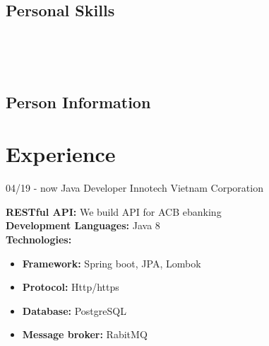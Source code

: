 \documentclass[]{friggeri-cv}
\begin{document}
\begin{aside}
  \section{Personal Skills}
~
    ~
\end{aside}
~

\begin{entrylist}
	\hspace{0.5cm} 
\end{entrylist}
\begin{center}
\section{Person Information}
\end{center}

\begin{entrylist}
		\hspace{2cm} 	 
		\hspace{2cm} 	
		\hspace{2cm} 	
		\hspace{2cm} 	
		\hspace{2cm} 	
\end{entrylist}

\section{Experience}

\begin{entrylist}
  \entry
    {04/19 - now}
    {Java Developer}
    {Innotech Vietnam Corporation}
    {\textbf{RESTful API: }We build API for ACB ebanking\\
    \textbf{Development Languages:} Java 8\\
    \textbf{Technologies:}~
    \begin{itemize}
    	\item \textbf{Framework:} Spring boot, JPA, Lombok
    	\item \textbf{Protocol:} Http/https
    	\item \textbf{Database:} PostgreSQL
    	\item \textbf{Message broker:} RabitMQ
    \end{itemize}
	}
\end{entrylist}
\end{document}
